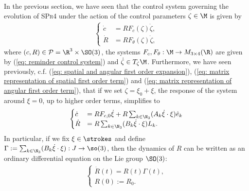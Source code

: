 In the previous section, we have seen that the control system governing the evolution of \textsc{SPr4} under the action of the control parameters $\zeta \in \M$ is given by
\begin{align}
\begin{cases}
	\dot{c} &= R F_c(\zeta) \dot{\zeta},\\
	\dot{R} &= R F_{\theta}(\zeta) \dot{\zeta},
\end{cases}
\end{align}
where $(c,R) \in \mathcal{P} = \R^3 \times \SO(3)$, the systems $F_{c}, F_{\theta}: \M \to M_{3 \times
 4}(\R)$ are given by (\ref{eq: reminder control system}) and $\dot{\zeta}  \in T_{\zeta}\M$. Furthermore, we have seen previously, c.f. (\ref{eq: spatial and angular first order expansion}), (\ref{eq: matrix representation of spatial first order term}) and (\ref{eq: matrix representation of angular first order term}), that if we set $\zeta = \xi_0 + \xi$, the response of the system around $\xi = 0$, up to higher order terms, simplifies to
 \begin{align}
 \label{eq: dynamics first approx}
 \begin{cases}
 	\dot{c} &= R F_{c,0} \dot{\xi} + R \sum_{k \in \N_3}(A_k \dot{\xi} \cdot \xi)\hat{e}_k\\
 	\dot{R} &= R \sum_{k \in \N_3} (B_k \dot{\xi} \cdot \xi) L_k.
 \end{cases}
 \end{align}
In particular, if we fix $\xi \in \strokes$ and define $\Gamma := \sum_{k \in \N_3} (B_k \dot{\xi} \cdot \xi): J \to \so(3)$, then the dynamics of $R$ can be written as an ordinary differential equation on the Lie group $\SO(3)$:
\begin{align}
\label{eq: orientation ode}
\begin{cases}
	\dot{R}(t) = R(t) \Gamma(t),\\
	R(0) := R_0.
\end{cases}
\end{align}

